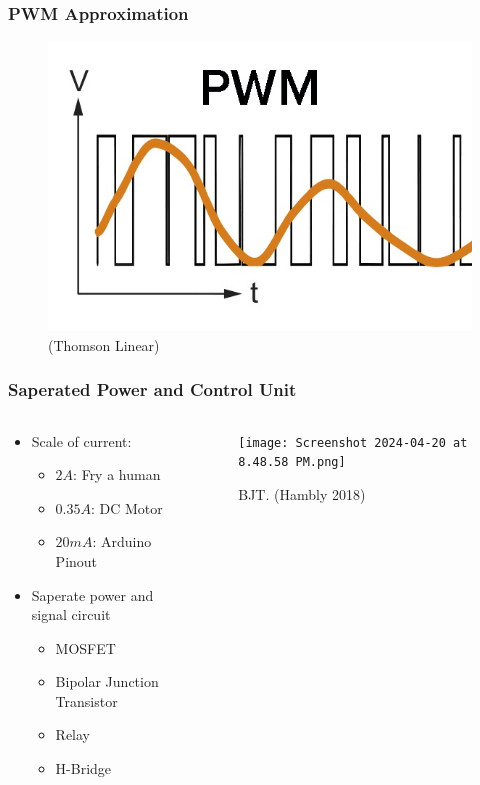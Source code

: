 \documentclass[compress, aspectratio=32]{beamer}
\begin{document}
\begin{frame}
    \frametitle{PWM Approximation}
    \begin{figure}
        \centering
        \includegraphics[height=0.7\textheight]{What-is-PWM-585x400.jpg}
        \caption*{(Thomson Linear)}
    \end{figure}
\end{frame}

\begin{frame}
    \frametitle{Saperated Power and Control Unit}
    \begin{columns}
        \begin{column}{0.4\textwidth}
            \begin{itemize}
                \item Scale of current:
                \begin{itemize}
                    \item $2A$: Fry a human
                    \item $0.35A$: DC Motor
                    \item $20mA$: Arduino Pinout
                \end{itemize}
                \item Saperate power and signal circuit
                \begin{itemize}
                    \item MOSFET
                    \item Bipolar Junction Transistor
                    \item Relay
                    \item H-Bridge
                \end{itemize}
            \end{itemize}
        \end{column}
        \begin{column}{0.6\textwidth}
            \begin{figure}
                \centering
                \texttt{[image: Screenshot 2024-04-20 at 8.48.58 PM.png]}
                \caption*{BJT. (Hambly 2018)}
            \end{figure}
        \end{column}
    \end{columns}
\end{frame}
\end{document}
